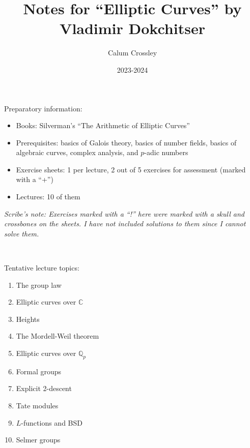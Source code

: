 \documentclass[a4paper]{article}
\title{Notes for ``Elliptic Curves'' by Vladimir Dokchitser}
\author{Calum Crossley}
\date{2023-2024}
\theoremstyle{plain}
\theoremstyle{remark}
\theoremstyle{definition}
\newcommand{\Q}{\mathbb{Q}}
\newcommand{\C}{\mathbb{C}}
\begin{document}
\maketitle

Preparatory information:
\begin{itemize}
    \item Books: Silverman's ``The Arithmetic of Elliptic Curves''
    \item Prerequisites: basics of Galois theory, basics of number fields,
        basics of algebraic curves, complex analysis, and $p$-adic numbers
    \item Exercise sheets: 1 per lecture, 2 out of 5 exercises for assessment
        (marked with a ``+'')
    \item Lectures: 10 of them
\end{itemize}

\textit{Scribe's note: Exercises marked with a ``!'' here were marked with a
    skull and crossbones on the sheets. I have not included solutions to them
    since I cannot solve them.}

~

Tentative lecture topics:
\begin{enumerate}[label=\arabic*)]
    \item The group law
    \item Elliptic curves over $\C$
    \item Heights
    \item The Mordell-Weil theorem
    \item Elliptic curves over $\Q_p$
    \item Formal groups
    \item Explicit 2-descent
    \item Tate modules
    \item $L$-functions and BSD
    \item Selmer groups
\end{enumerate}
\end{document}
